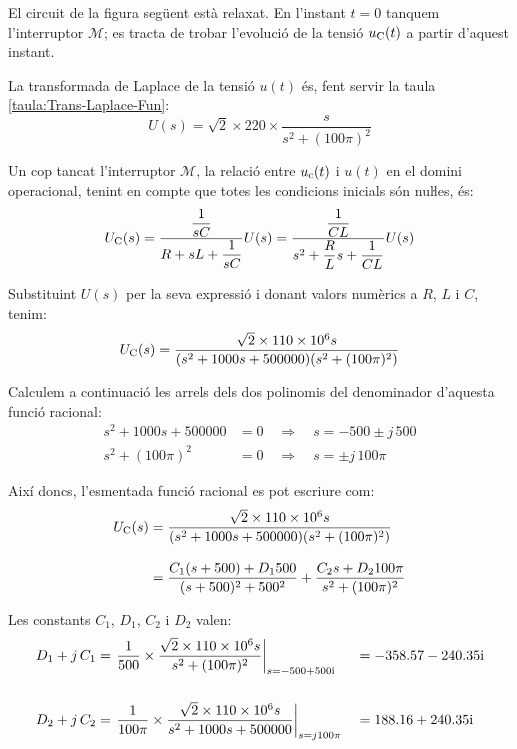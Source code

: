 \break	
\begin{exemple}\label{ex:CircuitLaplaceNul}	
	\addcontentsxms{\CircuitLaplaceNul}
    El circuit de la figura següent està relaxat. En l'instant $t=0$
    tanquem l'interruptor $\mathscr{M}$; es tracta de trobar l'evolució de la tensió
    $u_\mathrm{C}(t)$ a partir d'aquest instant.

    \begin{center}
        
    \end{center}

    La transformada de Laplace de la tensió $u(t)$ és, fent servir la taula \ref{taula:Trans-Laplace-Fun}:
    \[
        U(s) = \sqrt{2}\times 220\times \frac{s}{s^2 + (100\pi)^2}
    \]

    Un cop tancat l'interruptor $\mathscr{M}$, la relació entre $u_\mathrm{c}(t)$ i
    $u(t)$ en el domini operacional, tenint en compte que totes les
    condicions inicials són nuŀles, és:
    \[
        U_\mathrm{C}(s) = \frac{\dfrac{1}{sC}}{R+ sL +\dfrac{1}{sC}} U(s)=
        \frac{\dfrac{1}{CL}}{s^2 + \dfrac{R}{L}s +\dfrac{1}{CL}} U(s)
    \]

    Substituint $U(s)$ per la seva expressió i donant valors numèrics a
    $R$, $L$ i $C$, tenim:
    \[
        U_\mathrm{C}(s) = \frac{\sqrt{2}\times 110\times 10^6 s}{(s^2 + 1000 s + 500000)(s^2 + (100\pi)^2)}
    \]

    Calculem a continuació les arrels dels dos polinomis  del
    denominador d'aquesta funció racional:
    \begin{align*}
        s^2 + 1000 s + 500000 &= 0 \quad\Rightarrow\quad s = -500
        \pm j\,500 \\[0.5ex]
        s^2 + (100\pi)^2 &= 0 \quad\Rightarrow\quad s = \pm j\,100\pi
    \end{align*}

    Així doncs, l'esmentada funció racional es pot escriure com:
    \[\begin{split}
    U_\mathrm{C}(s) &= \frac{\sqrt{2}\times 110\times 10^6 s}{(s^2 + 1000 s +
    500000)(s^2 + (100\pi)^2)}   \\[2ex] &= \frac{C_1 (s+500) + D_1
    500}{(s+500)^2+500^2} + \frac{C_2 s + D_2 100 \pi}{s^2 +(100\pi)^2}
    \end{split}\]

    Les constants $C_1$, $D_1$,  $C_2$ i $D_2$ valen:
    \begin{alignat*}{2}
        D_1 + j\,C_1 &= \left.\frac{1}{500}\times \frac{\sqrt{2}\times 110\times 10^6 s}
        {s^2 +(100\pi)^2}\right|_{s=\complexnum{-500+j500}} &&= \complexnum{-358,57 -j 240,35}\\[3.5ex]
        D_2 + j\,C_2 &= \left.\frac{1}{100\pi}\times\frac{\sqrt{2}\times 110\times 10^6 s}
        {s^2 + 1000 s + 500000}\right|_{s=j 100\pi} &&= \complexnum{188,16 + j240,35}
    \end{alignat*}


\end{exemple}
